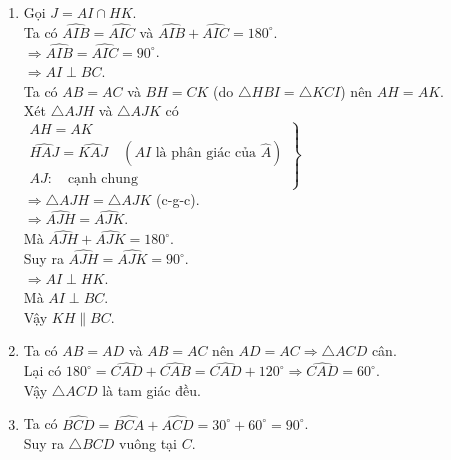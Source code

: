 \begin{vn}
{\begin{enumerate}
{
}
Xét $\triangle HBI$ vuông tại $H$ và $\triangle KCI$ vuông tại $K$ có\\
$\left. 
\begin{array}{l} 
BI=CI \quad \text{(gt)}\\
\widehat{HBI}=\widehat{KCI} \quad \text{(gt)}
\end{array} 
\right\} \Rightarrow \triangle HBI = \triangle KCI$ (cạnh huyền - góc nhọn).\\
$\Rightarrow IH=IK$.  
Từ $(1)$ và $(2)$ suy ra $\triangle HIK$ đều.
\item Gọi $J=AI\cap HK$.\\ 
Ta có $\widehat{AIB}=\widehat{AIC}$ và $\widehat{AIB}+\widehat{AIC}=180^{\circ}$.\\
$\Rightarrow \widehat{AIB}=\widehat{AIC}=90^{\circ}$. \\ 
$\Rightarrow AI \perp BC$. \\ 
Ta có $AB=AC$ và $BH=CK$ (do $\triangle HBI = \triangle KCI$) nên $AH=AK$.\\  
Xét $\triangle AJH$ và $\triangle AJK$ có\\
$\left. 
\begin{array}{l} 
AH=AK\\
\widehat{HAJ}=\widehat{KAJ} \quad (AI \text{ là phân giác của } \widehat{A})\\
AJ: \quad  \text{cạnh chung}
\end{array} 
\right\}$ \\
$\Rightarrow \triangle AJH = \triangle AJK$ (c-g-c).\\ 
$\Rightarrow \widehat{AJH}=\widehat{AJK}$.\\ 
Mà $\widehat{AJH}+\widehat{AJK}=180^{\circ}$.\\
Suy ra $\widehat{AJH}=\widehat{AJK}=90^{\circ}$.\\ 
$\Rightarrow AI\perp HK$.\\
Mà $AI \perp BC$.\\
Vậy $KH \parallel BC$.
\item Ta có $AB=AD$ và $AB=AC$ nên $AD=AC\Rightarrow \triangle ACD$ cân.\\ 
Lại có $180^{\circ}= \widehat{CAD}+\widehat{CAB}= \widehat{CAD}+120^{\circ}\Rightarrow \widehat{CAD}=60^{\circ}$.\\ 
Vậy $\triangle ACD$ là tam giác đều.
\item Ta có $\widehat{BCD}=\widehat{BCA}+\widehat{ACD}=30^{\circ}+60^{\circ}=90^{\circ}$.\\ 
Suy ra $\triangle BCD$ vuông tại $C$.
\end{enumerate}
}
\end{vn}


